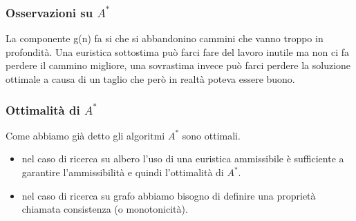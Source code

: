 \documentclass{article}
\begin{document}
\subsubsection{Osservazioni su $A^*$}
La componente g(n) fa si che si abbandonino cammini che vanno troppo in profondità. \newline
Una euristica sottostima può farci fare del lavoro inutile ma non ci fa perdere il cammino migliore, una sovrastima invece può farci perdere la soluzione ottimale a causa di un taglio che però in realtà poteva essere buono.

\subsubsection{Ottimalità di $A^*$}
Come abbiamo già detto gli algoritmi $A^*$ sono ottimali.
\begin{itemize}
    \item nel caso di ricerca su albero l'uso di una euristica ammissibile è sufficiente a garantire l'ammissibilità e quindi l'ottimalità di $A^*$.
    \item nel caso di ricerca su grafo abbiamo bisogno di definire una proprietà chiamata consistenza (o monotonicità).
\end{itemize}
\end{document}
